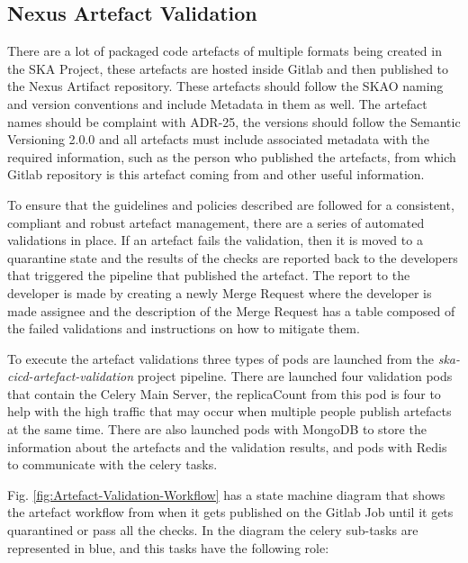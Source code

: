 \documentclass[a4paper,
               keeplastbox,   %
               ]{jacow}
\begin{document}
\subsection{Nexus Artefact Validation}

There are a lot of packaged code artefacts of multiple formats being created in the SKA Project, these artefacts are hosted inside Gitlab and then published to the Nexus Artifact repository. These artefacts should follow the SKAO naming and version conventions and include Metadata in them as well. The artefact names should be complaint with ADR-25, the versions should follow the Semantic Versioning 2.0.0 and all artefacts must include associated metadata with the required information, such as the person who published the artefacts, from which Gitlab repository is this artefact coming from and other useful information.

To ensure that the guidelines and policies described are followed for a consistent, compliant and robust artefact management, there are a series of automated validations in place. If an artefact fails the validation, then it is moved to a quarantine state and the results of the checks are reported back to the developers that triggered the pipeline that published the artefact. The report to the developer is made by creating a newly Merge Request where the developer is made assignee and the description of the Merge Request has a table composed of the failed validations and instructions on how to mitigate them.

To execute the artefact validations three types of pods are launched from the \textit{ska-cicd-artefact-validation} project pipeline. There are launched four validation pods that contain the Celery Main Server, the replicaCount from this pod is four to help with the high traffic that may occur when multiple people publish artefacts at the same time. There are also launched pods with MongoDB to store the information about the artefacts and the validation results, and pods with Redis to communicate with the celery tasks.

Fig. \ref{fig:Artefact-Validation-Workflow} has a state machine diagram that shows the artefact workflow from when it gets published on the Gitlab Job until it gets quarantined or pass all the checks. In the diagram the celery sub-tasks are represented in blue, and this tasks have the following role:
\end{document}
